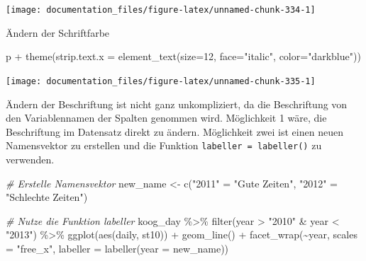 \documentclass[
]{article}
\newenvironment{Shaded}{\begin{snugshade}}{\end{snugshade}}
\newcommand{\AttributeTok}[1]{\textcolor[rgb]{0.77,0.63,0.00}{#1}}
\newcommand{\CommentTok}[1]{\textcolor[rgb]{0.56,0.35,0.01}{\textit{#1}}}
\newcommand{\DecValTok}[1]{\textcolor[rgb]{0.00,0.00,0.81}{#1}}
\newcommand{\FunctionTok}[1]{\textcolor[rgb]{0.00,0.00,0.00}{#1}}
\newcommand{\NormalTok}[1]{#1}
\newcommand{\OtherTok}[1]{\textcolor[rgb]{0.56,0.35,0.01}{#1}}
\newcommand{\SpecialCharTok}[1]{\textcolor[rgb]{0.00,0.00,0.00}{#1}}
\newcommand{\StringTok}[1]{\textcolor[rgb]{0.31,0.60,0.02}{#1}}
\begin{document}
\begin{center}\texttt{[image: documentation\_files/figure-latex/unnamed-chunk-334-1]} \end{center}

Ändern der Schriftfarbe

\begin{Shaded}
\begin{Highlighting}[]
\NormalTok{p }\SpecialCharTok{+} \FunctionTok{theme}\NormalTok{(}\AttributeTok{strip.text.x =} \FunctionTok{element\_text}\NormalTok{(}\AttributeTok{size=}\DecValTok{12}\NormalTok{, }\AttributeTok{face=}\StringTok{"italic"}\NormalTok{, }\AttributeTok{color=}\StringTok{"darkblue"}\NormalTok{))}
\end{Highlighting}
\end{Shaded}

\begin{center}\texttt{[image: documentation\_files/figure-latex/unnamed-chunk-335-1]} \end{center}

Ändern der Beschriftung ist nicht ganz unkompliziert, da die Beschriftung von den Variablennamen der Spalten genommen wird. Möglichkeit 1 wäre, die Beschriftung im Datensatz direkt zu ändern. Möglichkeit zwei ist einen neuen Namensvektor zu erstellen und die Funktion \texttt{labeller\ =\ labeller()} zu verwenden.

\begin{Shaded}
\begin{Highlighting}[]
\CommentTok{\# Erstelle Namensvektor}
\NormalTok{new\_name }\OtherTok{\textless{}{-}} \FunctionTok{c}\NormalTok{(}\StringTok{"2011"} \OtherTok{=} \StringTok{"Gute Zeiten"}\NormalTok{, }\StringTok{"2012"} \OtherTok{=} \StringTok{"Schlechte Zeiten"}\NormalTok{)}

\CommentTok{\# Nutze die Funktion labeller}
\NormalTok{koog\_day }\SpecialCharTok{\%\textgreater{}\%}
  \FunctionTok{filter}\NormalTok{(year }\SpecialCharTok{\textgreater{}} \StringTok{"2010"} \SpecialCharTok{\&}\NormalTok{ year }\SpecialCharTok{\textless{}} \StringTok{"2013"}\NormalTok{) }\SpecialCharTok{\%\textgreater{}\%}
  \FunctionTok{ggplot}\NormalTok{(}\FunctionTok{aes}\NormalTok{(daily, st10)) }\SpecialCharTok{+}
  \FunctionTok{geom\_line}\NormalTok{() }\SpecialCharTok{+}
  \FunctionTok{facet\_wrap}\NormalTok{(}\SpecialCharTok{\textasciitilde{}}\NormalTok{year, }\AttributeTok{scales =} \StringTok{"free\_x"}\NormalTok{, }\AttributeTok{labeller =} \FunctionTok{labeller}\NormalTok{(}\AttributeTok{year =}\NormalTok{ new\_name))}
\end{Highlighting}
\end{Shaded}
\end{document}
